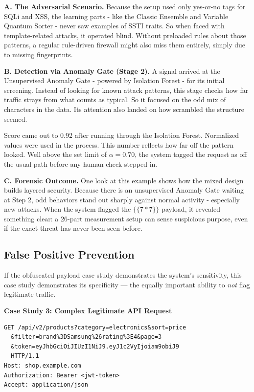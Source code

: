 \documentclass[journal,onecolumn]{IEEEtran}
\begin{document}
\textbf{A. The Adversarial Scenario.}
Because the setup used only yes-or-no tags for SQLi and XSS, the learning parts - like the Classic Ensemble and Variable Quantum Sorter - never saw examples of SSTI traits. So when faced with template-related attacks, it operated blind. Without preloaded rules about those patterns, a regular rule-driven firewall might also miss them entirely, simply due to missing fingerprints.

\textbf{B. Detection via Anomaly Gate (Stage 2).}
A signal arrived at the Unsupervised Anomaly Gate - powered by Isolation Forest - for its initial screening. Instead of looking for known attack patterns, this stage checks how far traffic strays from what counts as typical. So it focused on the odd mix of characters in the data. Its attention also landed on how scrambled the structure seemed.

Score came out to 0.92 after running through the Isolation Forest. Normalized values were used in the process. This number reflects how far off the pattern looked. Well above the set limit of $\alpha = 0.70$, the system tagged the request as off the usual path before any human check stepped in.

\textbf{C. Forensic Outcome.}
One look at this example shows how the mixed design builds layered security. Because there is an unsupervised Anomaly Gate waiting at Step 2, odd behaviors stand out sharply against normal activity - especially new attacks. When the system flagged the $\{\{7*7\}\}$ payload, it revealed something clear: a 26-part measurement setup can sense suspicious purpose, even if the exact threat has never been seen before.

\subsection{False Positive Prevention}

If the obfuscated payload case study demonstrates the system's sensitivity, this case study demonstrates its specificity --- the equally important ability to \textit{not} flag legitimate traffic.

\textbf{Case Study 3: Complex Legitimate API Request}

\begin{lstlisting}[caption={Legitimate complex API request that could trigger false positives.}, basicstyle=\ttfamily\footnotesize, breaklines=true]
GET /api/v2/products?category=electronics&sort=price
  &filter=brand%3DSamsung%26rating%3E4&page=3
  &token=eyJhbGciOiJIUzI1NiJ9.eyJ1c2VyIjoiam9obiJ9
  HTTP/1.1
Host: shop.example.com
Authorization: Bearer <jwt-token>
Accept: application/json
\end{lstlisting}
\end{document}
